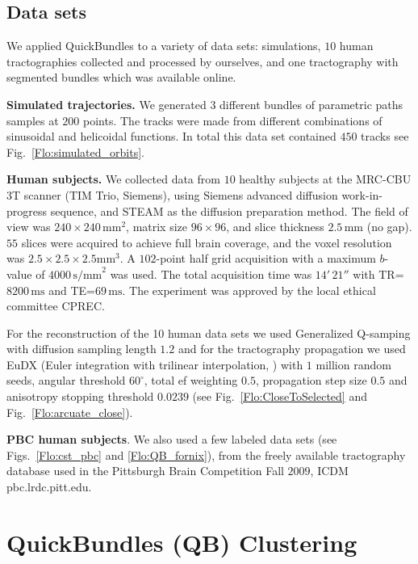 \documentclass[preprint,authoryear,a4paper,10pt,onecolumn]{elsarticle}
\begin{document}
\subsection{\label{sub:QB-Data-sets}Data sets}

We applied QuickBundles to a variety of data sets: simulations, $10$ human
tractographies collected and processed by ourselves, and one tractography
with segmented bundles which was available online.

\textbf{Simulated trajectories.} We generated $3$ different bundles of
parametric paths samples at $200$ points. The tracks were made from
different combinations of sinusoidal and helicoidal functions.  In total
this data set contained $450$ tracks see Fig.~\ref{Flo:simulated_orbits}.

\textbf{Human subjects.} We collected data from $10$ healthy subjects at
the MRC-CBU 3T scanner (TIM Trio, Siemens), using Siemens advanced
diffusion work-in-progress sequence, and STEAM
\citep{merboldt1992diffusion,MAB04} as the diffusion preparation
method. The field of view was $240\times240\,\textrm{mm}^{2}$, matrix size
$96\times96$, and slice thickness $2.5\,\textrm{mm}$ (no gap).  $55$ slices were
acquired to achieve full brain coverage, and the voxel resolution was
$2.5\times2.5\times2.5\textrm{mm}^{3}$. A $102$-point half grid
acquisition \citep{Yeh2010} with a maximum $b$-value of $4000\, \textrm{s/mm}^{2}$
was used. The total acquisition time was $14'\,21''$ with
TR=$8200\,\textrm{ms}$ and TE=$69\,\textrm{ms}$. The experiment was approved
by the local ethical committee CPREC.

For the reconstruction of the 10 human data sets we used Generalized
Q-samping \citep{Garyfallidis_thesis} with diffusion sampling length
$1.2$ and for the tractography propagation we used EuDX (Euler
integration with trilinear interpolation, \citet{Garyfallidis_thesis})
with $1$ million random seeds, angular threshold $60^{\circ}$, total
ef weighting $0.5$, propagation step size $0.5$ and anisotropy stopping
threshold $0.0239$ (see Fig.~\ref{Flo:CloseToSelected} 
and Fig.~\ref{Flo:arcuate_close}).

\textbf{PBC human subjects}. We also used a few labeled data sets (see
Figs.~\ref{Flo:cst_pbc} and \ref{Flo:QB_fornix}), from the freely available
tractography database used in the Pittsburgh Brain Competition Fall
$2009$, ICDM pbc.lrdc.pitt.edu.

\section{QuickBundles (QB) Clustering}
\end{document}
